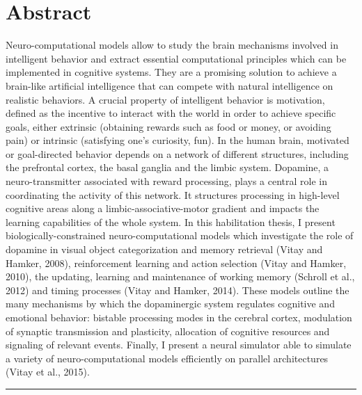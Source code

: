 \documentclass[
  11pt,
  a4paper,
]{scrbook}
\renewcommand*\contentsname{Table of contents}
\newcommand\contentsname{Table of contents}
\begin{document}
\cleardoublepage
\renewcommand*\contentsname{Table of contents}
{
\hypersetup{linkcolor=}
\setcounter{tocdepth}{2}
\tableofcontents
}
\mainmatter
{}

\chapter*{Abstract}\label{abstract}


Neuro-computational models allow to study the brain mechanisms involved
in intelligent behavior and extract essential computational principles
which can be implemented in cognitive systems. They are a promising
solution to achieve a brain-like artificial intelligence that can
compete with natural intelligence on realistic behaviors. A crucial
property of intelligent behavior is motivation, defined as the incentive
to interact with the world in order to achieve specific goals, either
extrinsic (obtaining rewards such as food or money, or avoiding pain) or
intrinsic (satisfying one's curiosity, fun). In the human brain,
motivated or goal-directed behavior depends on a network of different
structures, including the prefrontal cortex, the basal ganglia and the
limbic system. Dopamine, a neuro-transmitter associated with reward
processing, plays a central role in coordinating the activity of this
network. It structures processing in high-level cognitive areas along a
limbic-associative-motor gradient and impacts the learning capabilities
of the whole system. In this habilitation thesis, I present
biologically-constrained neuro-computational models which investigate
the role of dopamine in visual object categorization and memory
retrieval (Vitay and Hamker, 2008), reinforcement learning and action
selection (Vitay and Hamker, 2010), the updating, learning and
maintenance of working memory (Schroll et al., 2012) and timing
processes (Vitay and Hamker, 2014). These models outline the many
mechanisms by which the dopaminergic system regulates cognitive and
emotional behavior: bistable processing modes in the cerebral cortex,
modulation of synaptic transmission and plasticity, allocation of
cognitive resources and signaling of relevant events. Finally, I present
a neural simulator able to simulate a variety of neuro-computational
models efficiently on parallel architectures (Vitay et al., 2015).

\begin{center}\rule{0.5\linewidth}{0.5pt}\end{center}
\end{document}
